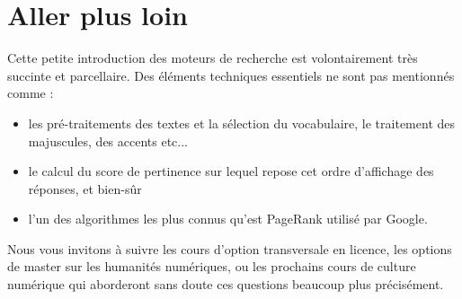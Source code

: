 \documentclass[12pt]{article}
\begin{document}
\section*{Aller plus loin}
\label{sec:section}

Cette petite introduction des moteurs de recherche est volontairement
très succinte et parcellaire. Des éléments techniques essentiels ne
sont pas mentionnés comme :
\begin{itemize}
\item les pré-traitements des textes et la sélection du vocabulaire,
  le traitement des majuscules, des accents etc...
\item le calcul du score de pertinence sur lequel repose cet ordre
  d'affichage des réponses, et bien-sûr
\item l'un des algorithmes les plus connus qu'est PageRank utilisé par
  Google.
\end{itemize}

Nous vous invitons à suivre les cours d'option transversale en
licence, les options de master sur les humanités numériques, ou les
prochains cours de culture numérique qui aborderont sans doute ces
questions beaucoup plus précisément.
\end{document}
